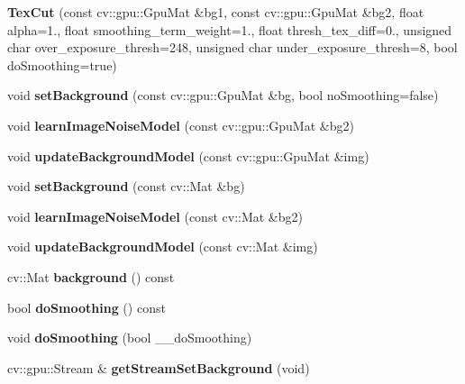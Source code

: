 \begin{DoxyCompactItemize}
\item 
\hypertarget{classskl_1_1gpu_1_1_tex_cut_abb5cdf45b8994faf5189ec982bffce08}{}\label{classskl_1_1gpu_1_1_tex_cut_abb5cdf45b8994faf5189ec982bffce08} 
{\bfseries Tex\+Cut} (const cv\+::gpu\+::\+Gpu\+Mat \&bg1, const cv\+::gpu\+::\+Gpu\+Mat \&bg2, float alpha=1., float smoothing\+\_\+term\+\_\+weight=1., float thresh\+\_\+tex\+\_\+diff=0., unsigned char over\+\_\+exposure\+\_\+thresh=248, unsigned char under\+\_\+exposure\+\_\+thresh=8, bool do\+Smoothing=true)
\item 
\hypertarget{classskl_1_1gpu_1_1_tex_cut_a7a29872141520673771dfb60013e4aa0}{}\label{classskl_1_1gpu_1_1_tex_cut_a7a29872141520673771dfb60013e4aa0} 
void {\bfseries set\+Background} (const cv\+::gpu\+::\+Gpu\+Mat \&bg, bool no\+Smoothing=false)
\item 
\hypertarget{classskl_1_1gpu_1_1_tex_cut_a9bcc32ef68f1ab5352fa33ea909bd333}{}\label{classskl_1_1gpu_1_1_tex_cut_a9bcc32ef68f1ab5352fa33ea909bd333} 
void {\bfseries learn\+Image\+Noise\+Model} (const cv\+::gpu\+::\+Gpu\+Mat \&bg2)
\item 
\hypertarget{classskl_1_1gpu_1_1_tex_cut_a05adae108755609cfcdbeecca045ef9e}{}\label{classskl_1_1gpu_1_1_tex_cut_a05adae108755609cfcdbeecca045ef9e} 
void {\bfseries update\+Background\+Model} (const cv\+::gpu\+::\+Gpu\+Mat \&img)
\item 
\hypertarget{classskl_1_1gpu_1_1_tex_cut_a7da9b6a166f0d1bd87c63b77b722a6b1}{}\label{classskl_1_1gpu_1_1_tex_cut_a7da9b6a166f0d1bd87c63b77b722a6b1} 
void {\bfseries set\+Background} (const cv\+::\+Mat \&bg)
\item 
\hypertarget{classskl_1_1gpu_1_1_tex_cut_a1ecc86f3961f8febc70ad1b8f05a870d}{}\label{classskl_1_1gpu_1_1_tex_cut_a1ecc86f3961f8febc70ad1b8f05a870d} 
void {\bfseries learn\+Image\+Noise\+Model} (const cv\+::\+Mat \&bg2)
\item 
\hypertarget{classskl_1_1gpu_1_1_tex_cut_ac5dd4b7b756a6c354d8d9cb642babc0c}{}\label{classskl_1_1gpu_1_1_tex_cut_ac5dd4b7b756a6c354d8d9cb642babc0c} 
void {\bfseries update\+Background\+Model} (const cv\+::\+Mat \&img)
\item 
\hypertarget{classskl_1_1gpu_1_1_tex_cut_adc746bf324057c087feab95ef0982056}{}\label{classskl_1_1gpu_1_1_tex_cut_adc746bf324057c087feab95ef0982056} 
cv\+::\+Mat {\bfseries background} () const
\item 
\hypertarget{classskl_1_1gpu_1_1_tex_cut_a39564819fa2bbc56882e1a8dfc64209e}{}\label{classskl_1_1gpu_1_1_tex_cut_a39564819fa2bbc56882e1a8dfc64209e} 
bool {\bfseries do\+Smoothing} () const
\item 
\hypertarget{classskl_1_1gpu_1_1_tex_cut_a354d9d8c8509ce75bb15641159e65256}{}\label{classskl_1_1gpu_1_1_tex_cut_a354d9d8c8509ce75bb15641159e65256} 
void {\bfseries do\+Smoothing} (bool \+\_\+\+\_\+do\+Smoothing)
\item 
\hypertarget{classskl_1_1gpu_1_1_tex_cut_a6d2b4c631e685a5d873bacb85c90b190}{}\label{classskl_1_1gpu_1_1_tex_cut_a6d2b4c631e685a5d873bacb85c90b190} 
cv\+::gpu\+::\+Stream \& {\bfseries get\+Stream\+Set\+Background} (void)
\end{DoxyCompactItemize}
